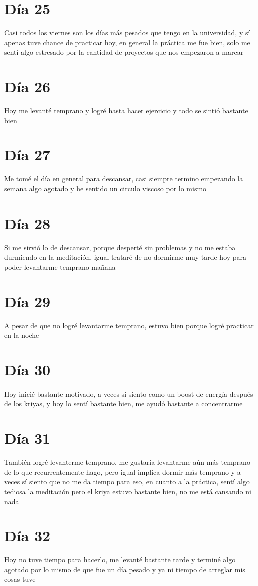 \documentclass[11pt]{report}
\theoremstyle{plain}
\theoremstyle{definition}
\begin{document}
\section*{Día 25}
	Casi todos los viernes son los días más pesados que tengo en la universidad, y sí apenas tuve chance de practicar hoy, en general la práctica me fue bien, solo me sentí algo estresado por la cantidad de proyectos que nos empezaron a marcar
\section*{Día 26}%
	Hoy me levanté temprano y logré hasta hacer ejercicio y todo se sintió bastante bien
\section*{Día 27}%
	Me tomé el día en general para descansar, casi siempre termino empezando la semana algo agotado y he sentido un circulo viscoso por lo mismo
\section*{Día 28}
	Si me sirvió lo de descansar, porque desperté sin problemas y no me estaba durmiendo en la meditación, igual trataré de no dormirme muy tarde hoy para poder levantarme temprano mañana
\section*{Día 29}
	A pesar de que no logré levantarme temprano, estuvo bien porque logré practicar en la noche
\section*{Día 30}
	Hoy inicié bastante motivado, a veces sí siento como un boost de energía después de los kriyas, y hoy lo sentí bastante bien, me ayudó bastante a concentrarme
\section*{Día 31}
	También logré levanterme temprano, me gustaría levantarme aún más temprano de lo que recurrentemente hago, pero igual implica dormir más temprano y a veces sí siento que no me da tiempo para eso, en cuanto a la práctica, sentí algo tediosa la meditación pero el kriya estuvo bastante bien, no me está cansando ni nada
\section*{Día 32}
	Hoy no tuve tiempo para hacerlo, me levanté bastante tarde y terminé algo agotado por lo mismo de que fue un día pesado y ya ni tiempo de arreglar mis cosas tuve
\end{document}
